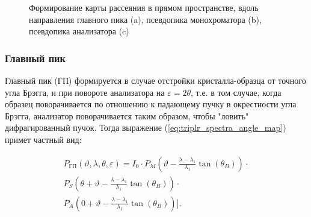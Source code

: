 \begin{figure}[H]
  \centering
  \hfill
  \hfill
  \caption{Формирование карты рассеяния в прямом пространстве, вдоль направления главного пика (a),
  псевдопика монохроматора (b), псевдопика анализатора (c)}
  \label{ris:triple_map_piks}
\end{figure}

\subsubsection*{Главный пик}
Главный пик (ГП) формируется в случае отстройки кристалла-образца от точного угла Брэгга,
 и при повороте анализатора на $\varepsilon = 2\theta$, т.е. в том случае, когда
  образец поворачивается по отношению к падающему пучку в окрестности угла Брэгга,
  анализатор поворачивается таким образом, чтобы "ловить" дифрагированный пучок.
Тогда выражение (\ref{eq:triplr_spectra_angle_map}) примет частный вид:

\begin{eqnarray} \label{eq:triplr_spectra_angle_map_GP}
  P_{\text{ГП}}(\vartheta,\lambda,\theta,\varepsilon) =I_0\cdot
    P_M \left(\vartheta - \frac{\lambda - \lambda_1}{\lambda_1}\tan(\theta_B) \right) \cdot \nonumber \\
   P_S \left(\theta + \vartheta - \frac{\lambda - \lambda_1}{\lambda_1}\tan(\theta_B)\right)  \cdot  \nonumber \\
   P_A \left(0+\vartheta - \frac{\lambda - \lambda_1}{\lambda_1}\tan(\theta_B)\right) \Bigg].
 \end{eqnarray}

